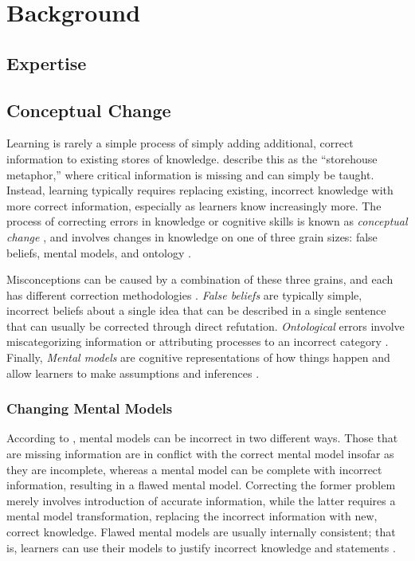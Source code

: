 \documentclass{book}
\begin{document}
\author{Andrew F. Lilja}
\date{Today}

\chapter{Background}

\section{Expertise}


\section{Conceptual Change}

Learning is rarely a simple process of simply adding additional, correct information to existing stores of knowledge. \citet*{Klein2006} describe this as the ``storehouse metaphor,'' where critical information is missing and can simply be taught. Instead, learning typically requires replacing existing, incorrect knowledge with more correct information, especially as learners know increasingly more. The process of correcting errors in knowledge or cognitive skills is known as \emph{conceptual change} \citep{Chi2008}, and involves changes in knowledge on one of three grain sizes: false beliefs, mental models, and ontology \citep{Gadgil2012}.

Misconceptions can be caused by a combination of these three grains, and each has different correction methodologies \citep{Gadgil2012}. \emph{False beliefs} are typically simple, incorrect beliefs about a single idea that can be described in a single sentence that can usually be corrected through direct refutation. \emph{Ontological} errors involve miscategorizing information or attributing processes to an incorrect category \citep{Chi1994}. Finally, \emph{Mental models} are cognitive representations of how things happen \citep{Klein2006} and allow learners to make assumptions and inferences \citep{Gadgil2012}.

\subsection{Changing Mental Models}

According to \citet{Chi2008}, mental models can be incorrect in two different ways. Those that are missing information are in conflict with the correct mental model insofar as they are incomplete, whereas a mental model can be complete with incorrect information, resulting in a flawed mental model. Correcting the former problem merely involves introduction of accurate information, while the latter requires a mental model transformation, replacing the incorrect information with new, correct knowledge. Flawed mental models are usually internally consistent; that is, learners can use their models to justify incorrect knowledge and statements \citep{Vosniadou1994}.
\end{document}
